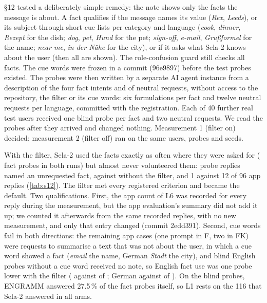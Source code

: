 \documentclass[10pt,twocolumn]{article}
\newcommand{\pct}{\,\%}
\begin{document}
\S12 tested a deliberately simple remedy: the note shows only the facts the message is about. A fact qualifies if the
message names its value (\emph{Rex}, \emph{Leeds}), or its subject through short cue lists per category and language
(\emph{cook}, \emph{dinner}, \emph{Rezept} for the dish; \emph{dog}, \emph{pet}, \emph{Hund} for the pet;
\emph{sign-off}, \emph{e-mail}, \emph{Gru\ss{}formel} for the name; \emph{near me}, \emph{in der N\"ahe} for the city), or
if it asks what Sela-2 knows about the user (then all are shown). The role-confusion guard still checks all facts. The
cue words were frozen in a commit (96e9897) before the test probes existed. The probes were then written by a separate
AI agent instance from a description of the four fact intents and of neutral requests, without access to the
repository, the filter or its cue words: six formulations per fact and twelve neutral requests per language,
committed with the registration. Each of 40 further real test users received one blind probe per fact and two neutral
requests. We read the probes after they arrived and changed nothing. Measurement 1 (filter on) decided; measurement 2
(filter off) ran on the same users, probes and seeds.

With the filter, Sela-2 used the facts exactly as often where they were asked for ( fact probes in both
runs) but almost never volunteered them:  probe replies named an unrequested fact, against
 without the filter, and 1 against 12 of 96 app replies (\cref{tab:s12}). The filter met every registered
criterion and became the default. Two qualifications. First, the app count of L6 was recorded for every reply during the
measurement, but the app evaluation's summary did not add it up; we counted it afterwards from the same recorded replies,
with no new measurement, and only that entry changed (commit 2edd391). Second, cue words fail in both directions: the
remaining app cases (one prompt in F, two in FK) were requests to summarise a text that was not about the user, in
which a cue word showed a fact (\emph{email} the name, German \emph{Stadt} the city), and blind English probes without a
cue word received no note, so English fact use was one probe lower with the filter
( against  of ; German  against
 of ). On the blind probes, ENGRAMM answered 27.5\pct{} of the
fact probes itself, so L1 rests on the 116 that Sela-2 answered in all arms.
\end{document}
